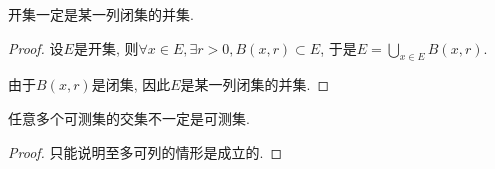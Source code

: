 \documentclass[theorem=false,mathfont=none,openany,sub3section]{easybook}
\begin{document}
\begin{example}
  开集一定是某一列闭集的并集.
\end{example}

\begin{proof}
  设$E$是开集, 则$\forall x\in E, \exists r>0, B(x,r)\subset E$, 于是$E=\bigcup_{x\in E}B(x,r)$.\par
  由于$B(x,r)$是闭集, 因此$E$是某一列闭集的并集.\par
\end{proof}

\begin{example}
  任意多个可测集的交集不一定是可测集.
\end{example}

\begin{proof}
  只能说明至多可列的情形是成立的.\par
\end{proof}

\backmatter
\end{document}
